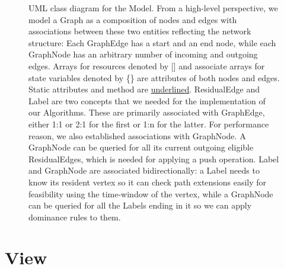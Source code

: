 \begin{figure}
\begin{tikzpicture}
\end{tikzpicture}
\caption{UML class diagram for the Model. From a high-level perspective, we model a Graph as a composition of nodes and edges with associations between these two entities reflecting the network structure: Each GraphEdge has a start and an end node, while each GraphNode has an arbitrary number of incoming and outgoing edges. Arrays for resources denoted by [] and associate arrays for state variables denoted by \{\} are attributes of both nodes and edges. Static attributes and method are \underline{underlined}. ResidualEdge and Label are two concepts that we needed for the implementation of our Algorithms. These are primarily associated with GraphEdge, either 1:1 or 2:1 for the first or 1:n for the latter. For performance reason, we also established associations with GraphNode. A GraphNode can be queried for all its current outgoing eligible ResidualEdges, which is needed for applying a push operation. Label and GraphNode are associated bidirectionally: a Label needs to know its resident vertex so it can check path extensions easily for feasibility using the time-window of the vertex, while a GraphNode can be queried for all the Labels ending in it so we can apply dominance rules to them.}
\label{fig:model}
\end{figure}



\section{View}


